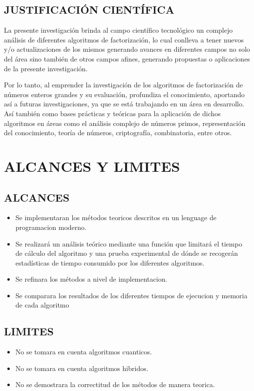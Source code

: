         \subsection{JUSTIFICACIÓN CIENTÍFICA}
        La presente investigación brinda al campo científico tecnológico un complejo análisis de diferentes algoritmos de factorización, lo cual conlleva a tener nuevos y/o actualizaciones de los mismos generando avances en diferentes campos no solo del área sino también de otros campos afines, generando propuestas o aplicaciones de la presente investigación.

        Por lo tanto, al emprender la investigación de los algoritmos de factorización de números enteros grandes y su evaluación, profundiza el conocimiento, aportando así a futuras investigaciones, ya que se está trabajando en un área en desarrollo. Así también como bases prácticas y teóricas para la aplicación de dichos algoritmos en áreas como el análisis complejo de números primos, representación del conocimiento, teoría de números, criptografía, combinatoria, entre otros.
    
    \section{ALCANCES Y LIMITES}
        \subsection{ALCANCES}
        \begin{itemize}
            \item{Se implementaran los métodos teoricos descritos en un lenguage de programacion moderno.}
            \item{Se realizará un análisis teórico mediante una función que limitará el tiempo de cálculo del algoritmo y una prueba experimental de dónde se recogerán estadísticas de tiempo consumido por los diferentes algoritmos.}
            \item{Se refinara los métodos a nivel de implementacion.}
            \item{Se comparara los resultados de los diferentes tiempos de ejecucion y memoria de cada algoritmo}
            
        \end{itemize}
        \subsection{LIMITES}
        \begin{itemize}
            \item{No se tomara en cuenta algoritmos cuanticos.}
            \item{No se tomara en cuenta algoritmos hibridos.}
            \item{No se demostrara la correctitud de los métodos de manera teorica.}
        \end{itemize}
    

